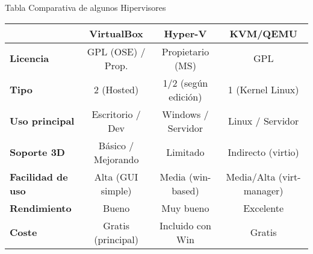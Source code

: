 \documentclass{beamer}
\begin{document}
\scriptsize %
\begin{frame}{Tabla Comparativa de algunos Hipervisores}
\begin{center}
\scriptsize %
\begin{tabular}{l c c c}
\toprule
 & \textbf{VirtualBox} & \textbf{Hyper-V} & \textbf{KVM/QEMU} \\
\midrule
\textbf{Licencia} & GPL (OSE) / Prop. & Propietario (MS) & GPL  \\
\textbf{Tipo} & 2 (Hosted) & 1/2 (según edición) & 1 (Kernel Linux) \\
\textbf{Uso principal} & Escritorio / Dev & Windows / Servidor & Linux / Servidor \\
\textbf{Soporte 3D} & Básico / Mejorando & Limitado & Indirecto (virtio) \\
\textbf{Facilidad de uso} & Alta (GUI simple) & Media (win-based) & Media/Alta (virt-manager) \\
\textbf{Rendimiento} & Bueno & Muy bueno & Excelente \\
\textbf{Coste} & Gratis (principal) & Incluido con Win & Gratis \\
\bottomrule
\end{tabular}
\end{center}
\end{frame}
\end{document}
